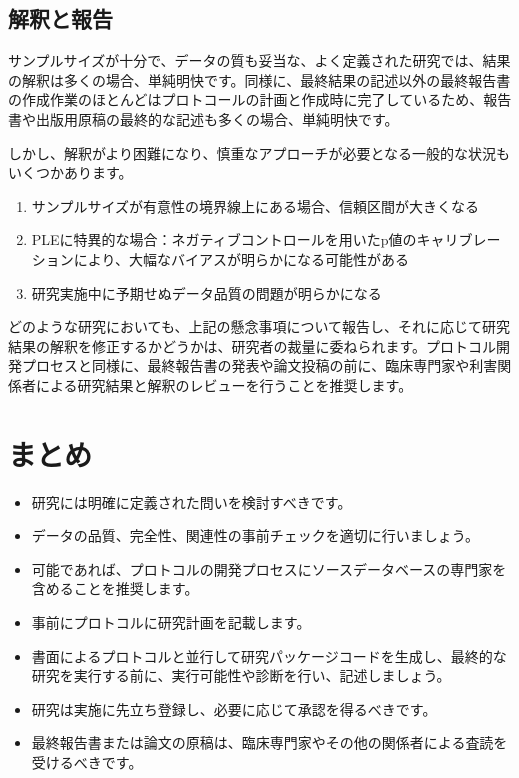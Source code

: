 \documentclass[
  11pt]{book}
\makeatletter
\providecommand{\tightlist}{%
  \setlength{\itemsep}{0pt}\setlength{\parskip}{0pt}}
\newenvironment{kframe}{%
\medskip{}
\setlength{\fboxsep}{.8em}
 \def\at@end@of@kframe{}%
 \ifinner\ifhmode%
  \def\at@end@of@kframe{\end{minipage}}%
  \begin{minipage}{\columnwidth}%
 \fi\fi%
 \def\FrameCommand##1{\hskip\@totalleftmargin \hskip-\fboxsep
 \colorbox{myShadeColor}{##1}\hskip-\fboxsep
     \hskip-\linewidth \hskip-\@totalleftmargin \hskip\columnwidth}%
 \MakeFramed {\advance\hsize-\width
   \@totalleftmargin\z@ \linewidth\hsize
   \@setminipage}}%
 {\par\unskip\endMakeFramed%
 \at@end@of@kframe}
\newenvironment{rmdblock}[1]
  {
  \begin{itemize}
  \renewcommand{\labelitemi}{
    \raisebox{-.7\height}[0pt][0pt]{
      {\setkeys{Gin}{width=3em,keepaspectratio}\texttt{[image: images/\#1]}}
    }
  }
  \setlength{\fboxsep}{1em}
  \begin{kframe}
  \item
  }
  {
  \end{kframe}
  \end{itemize}
  }
\newenvironment{rmdsummary}
  {\begin{rmdblock}{summary}}
  {\end{rmdblock}}
\theoremstyle{definition}
\theoremstyle{definition}
\theoremstyle{definition}
\theoremstyle{definition}
\theoremstyle{remark}
\makeatother
\begin{document}
\subsection{解釈と報告}\label{ux89e3ux91c8ux3068ux5831ux544a}

サンプルサイズが十分で、データの質も妥当な、よく定義された研究では、結果の解釈は多くの場合、単純明快です。同様に、最終結果の記述以外の最終報告書の作成作業のほとんどはプロトコールの計画と作成時に完了しているため、報告書や出版用原稿の最終的な記述も多くの場合、単純明快です。

しかし、解釈がより困難になり、慎重なアプローチが必要となる一般的な状況もいくつかあります。

\begin{enumerate}
\def\labelenumi{\arabic{enumi}.}
\item
  サンプルサイズが有意性の境界線上にある場合、信頼区間が大きくなる
\item
  PLEに特異的な場合：ネガティブコントロールを用いたp値のキャリブレーションにより、大幅なバイアスが明らかになる可能性がある
\item
  研究実施中に予期せぬデータ品質の問題が明らかになる
\end{enumerate}

どのような研究においても、上記の懸念事項について報告し、それに応じて研究結果の解釈を修正するかどうかは、研究者の裁量に委ねられます。プロトコル開発プロセスと同様に、最終報告書の発表や論文投稿の前に、臨床専門家や利害関係者による研究結果と解釈のレビューを行うことを推奨します。

\section{まとめ}\label{ux307eux3068ux3081-15}

\begin{rmdsummary}
\begin{itemize}
\tightlist
\item
  研究には明確に定義された問いを検討すべきです。
\item
  データの品質、完全性、関連性の事前チェックを適切に行いましょう。
\item
  可能であれば、プロトコルの開発プロセスにソースデータベースの専門家を含めることを推奨します。
\item
  事前にプロトコルに研究計画を記載します。
\item
  書面によるプロトコルと並行して研究パッケージコードを生成し、最終的な研究を実行する前に、実行可能性や診断を行い、記述しましょう。
\item
  研究は実施に先立ち登録し、必要に応じて承認を得るべきです。
\item
  最終報告書または論文の原稿は、臨床専門家やその他の関係者による査読を受けるべきです。
\end{itemize}
\end{rmdsummary}
\end{document}
